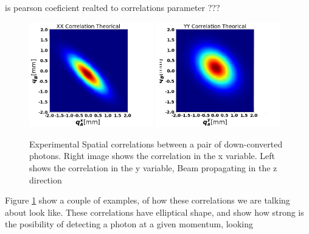 is pearson coeficient realted to correlations parameter ???

\begin{figure}[h!]
\centering
{  \includegraphics[width=0.48\textwidth]{Figures/theoricalxx.png} }
{  \includegraphics[width=0.48\textwidth]{Figures/theoricalyy.png} }
\caption{Experimental Spatial correlations between a pair of down-converted photons. Right image shows the correlation in the x variable. Left shows the correlation in the y variable, Beam propagating in the z direction}
 \label{fig:corre}
\end{figure}
Figure \ref{fig:corre} show a couple of examples, of how these correlations we are talking about look like. These correlations have elliptical shape,
and show how strong is the posibility of detecting a photon at a given momentum, looking 
